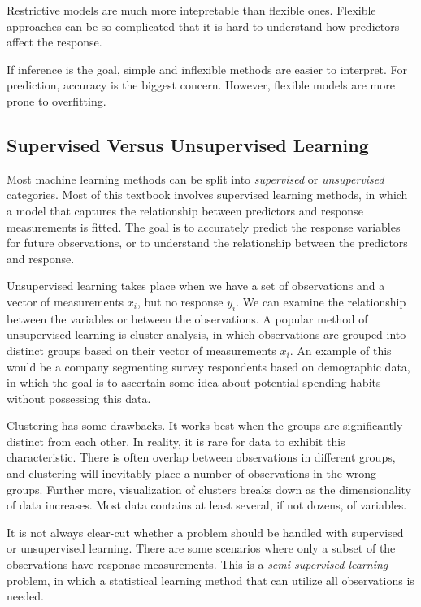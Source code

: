 \documentclass[]{book}
\begin{document}
Restrictive models are much more intepretable than flexible ones. Flexible approaches can be so complicated that it is hard to understand how predictors affect the response.

If inference is the goal, simple and inflexible methods are easier to interpret. For prediction, accuracy is the biggest concern. However, flexible models are more prone to overfitting.

\hypertarget{supervised-versus-unsupervised-learning}{%
\subsection{Supervised Versus Unsupervised Learning}\label{supervised-versus-unsupervised-learning}}

Most machine learning methods can be split into \emph{supervised} or \emph{unsupervised} categories. Most of this textbook involves supervised learning methods, in which a model that captures the relationship between predictors and response measurements is fitted. The goal is to accurately predict the response variables for future observations, or to understand the relationship between the predictors and response.

Unsupervised learning takes place when we have a set of observations and a vector of measurements \(x_i\), but no response \(y_i\). We can examine the relationship between the variables or between the observations. A popular method of unsupervised learning is \href{https://en.wikipedia.org/wiki/Cluster_analysis}{cluster analysis}, in which observations are grouped into distinct groups based on their vector of measurements \(x_i\). An example of this would be a company segmenting survey respondents based on demographic data, in which the goal is to ascertain some idea about potential spending habits without possessing this data.

Clustering has some drawbacks. It works best when the groups are significantly distinct from each other. In reality, it is rare for data to exhibit this characteristic. There is often overlap between observations in different groups, and clustering will inevitably place a number of observations in the wrong groups. Further more, visualization of clusters breaks down as the dimensionality of data increases. Most data contains at least several, if not dozens, of variables.

It is not always clear-cut whether a problem should be handled with supervised or unsupervised learning. There are some scenarios where only a subset of the observations have response measurements. This is a \emph{semi-supervised learning} problem, in which a statistical learning method that can utilize all observations is needed.
\end{document}
